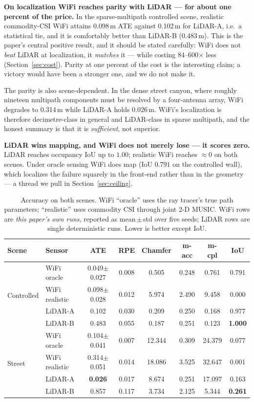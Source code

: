 \documentclass[journal]{IEEEtran}
\newcommand{\SI}[2]{#1\,#2}
\begin{document}
\textbf{On localization WiFi reaches parity with LiDAR --- for about one percent of the
price.} In the sparse-multipath controlled scene, realistic commodity-CSI WiFi attains
\SI{0.098}{m} ATE against \SI{0.102}{m} for LiDAR-A, i.e.\ a statistical tie, and it is
comfortably better than LiDAR-B (\SI{0.483}{m}). This is the paper's central positive
result, and it should be stated carefully: WiFi does not \emph{beat} LiDAR at localization,
it \emph{matches} it --- while costing 84--600$\times$ less (Section~\ref{sec:cost}).
Parity at one percent of the cost is the interesting claim; a victory would have been a
stronger one, and we do not make it.

The parity is also scene-dependent. In the dense street canyon, where roughly nineteen
multipath components must be resolved by a four-antenna array, WiFi degrades to
\SI{0.314}{m} while LiDAR-A holds \SI{0.026}{m}. WiFi's localization is therefore
decimetre-class in general and LiDAR-class in sparse multipath, and the honest summary is
that it is \emph{sufficient}, not superior.

\textbf{LiDAR wins mapping, and WiFi does not merely lose --- it scores zero.} LiDAR
reaches occupancy IoU up to $1.00$; realistic WiFi reaches $\approx0$ on both scenes. Under
oracle sensing WiFi does map (IoU $0.791$ on the controlled wall), which localizes the
failure squarely in the front-end rather than in the geometry --- a thread we pull in
Section~\ref{sec:ceiling}.

\begin{table}[t]
\caption{Accuracy on both scenes. WiFi ``oracle'' uses the ray tracer's true path
parameters; ``realistic'' uses commodity CSI through joint 2-D MUSIC. WiFi rows are
\emph{this paper's own runs}, reported as mean\,$\pm$\,std over five seeds; LiDAR rows are
single deterministic runs. Lower is better except IoU.}
\label{tab:rq3}
\centering
\footnotesize
\setlength{\tabcolsep}{3pt}
\begin{tabular}{llcccccc}
\toprule
Scene & Sensor & ATE & RPE & Chamfer & m-acc & m-cpl & IoU \\
\midrule
\multirow{4}{*}{Controlled}
 & WiFi oracle    & 0.049$\pm$0.027 & 0.008 & 0.505 & 0.248 & 0.761 & 0.791 \\
 & WiFi realistic & 0.098$\pm$0.028 & 0.012 & 5.974 & 2.490 & 9.458 & 0.000 \\
 & LiDAR-A        & 0.102 & 0.030 & 0.209 & 0.250 & 0.168 & 0.977 \\
 & LiDAR-B        & 0.483 & 0.055 & 0.187 & 0.251 & 0.123 & \textbf{1.000} \\
\midrule
\multirow{4}{*}{Street}
 & WiFi oracle    & 0.104$\pm$0.041 & 0.007 & 12.344 & 0.309 & 24.379 & 0.077 \\
 & WiFi realistic & 0.314$\pm$0.051 & 0.014 & 18.086 & 3.525 & 32.647 & 0.001 \\
 & LiDAR-A        & \textbf{0.026} & 0.017 & 8.674 & 0.251 & 17.097 & 0.163 \\
 & LiDAR-B        & 0.857 & 0.117 & 3.734 & 2.125 & 5.344 & \textbf{0.261} \\
\bottomrule
\end{tabular}
\end{table}
\end{document}
